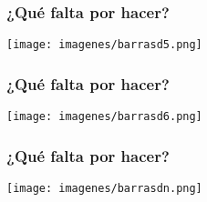 \documentclass[compress]{beamer}
\begin{document}




{
\begin{frame}
\frametitle{¿Qué falta por hacer?}
\vspace{-0.5cm}

\begin{center}
\hspace*{-1cm}\texttt{[image: imagenes/barrasd5.png]}\\

\end{center}

\end{frame}
}

{
\begin{frame}
\frametitle{¿Qué falta por hacer?}
\vspace{-0.5cm}

\begin{center}
\hspace*{-1cm}\texttt{[image: imagenes/barrasd6.png]}\\

\end{center}

\end{frame}
}

{
\begin{frame}
\frametitle{¿Qué falta por hacer?}
\vspace{-0.5cm}

\begin{center}
\hspace*{-1cm}\texttt{[image: imagenes/barrasdn.png]}\\

\end{center}

\end{frame}
}
\end{document}
